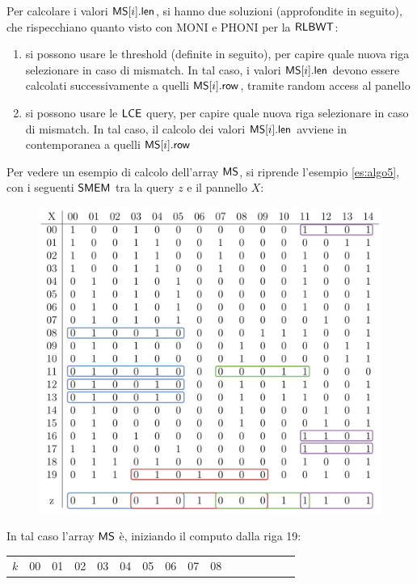Per calcolare i valori $\mbox{\rm {\sf MS}}[i].\mbox{\rm {\sf len}}$,  si hanno due soluzioni (approfondite in
seguito), che 
rispecchiano quanto visto con 
MONI \cite{moni} e PHONI \cite{phoni} per la $\mbox{\rm {\sf RLBWT}}$: 
\begin{enumerate}
  \item si possono usare le threshold (definite in seguito), per capire quale
  nuova riga 
  selezionare in 
  caso di mismatch. In tal caso, i valori $\mbox{\rm {\sf MS}}[i].\mbox{\rm {\sf len}}$ devono essere calcolati
  successivamente a quelli $\mbox{\rm {\sf MS}}[i].\mbox{\rm {\sf row}}$, tramite random
  access al panello
  \item si possono usare le $\mbox{\rm {\sf LCE}}$ query, per capire quale nuova riga
  selezionare in caso di mismatch. In tal caso, il calcolo dei valori
  $\mbox{\rm {\sf MS}}[i].\mbox{\rm {\sf len}}$ avviene in contemporanea a quelli $\mbox{\rm {\sf MS}}[i].\mbox{\rm {\sf row}}$
\end{enumerate}
\begin{esempio}
  \label{es:ms}
  Per vedere un esempio di calcolo dell'array $\mbox{\rm {\sf MS}}$,
  si riprende l'esempio \ref{es:algo5}, con i seguenti $\mbox{\rm {\sf SMEM}}$ tra la query $z$
  e il pannello $X$:
  \begin{figure}[H]
    \centering
    \includegraphics[scale = 0.345]{img/pbwtmatch.pdf}
  \end{figure}
  In tal caso l'array $\mbox{\rm {\sf MS}}$ è, iniziando il computo dalla riga 19:
  \begin{table}[H]
    \footnotesize
    \centering
    \begin{tabular}{c|ccccccccccccccc}
      $k$ & 00 & 01 & 02 & 03 & 04 &  {\color{nordcyan}05} & 06 & 07 & 08

\end{tabular}
\end{table}
\end{esempio}

